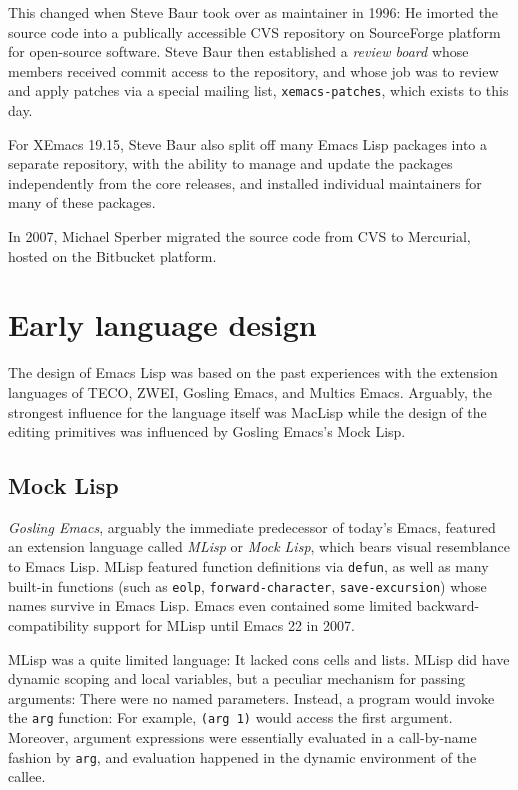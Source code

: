 \documentclass[format=acmsmall, review]{acmart}
\newcommand \Elisp {Emacs Lisp}
\begin{document}
This changed when Steve Baur took over as maintainer in 1996: He
imorted the source code into a publically accessible CVS repository on
SourceForge platform for open-source software.  Steve Baur then
established a \textit{review board} whose members received commit
access to the repository, and whose job was to review and apply
patches via a special mailing list, \texttt{xemacs-patches}, which
exists to this day.

For XEmacs 19.15, Steve Baur also split off many \Elisp{} packages
into a separate repository, with the ability to manage and update the
packages independently from the core releases, and installed
individual maintainers for many of these packages.

In 2007, Michael Sperber migrated the source code from CVS to
Mercurial, hosted on the Bitbucket platform.

\section{Early language design}         %
\label{sec:early-history}

The design of \Elisp{} was based on the past experiences with the extension
languages of TECO, ZWEI, Gosling Emacs, and Multics Emacs.
Arguably, the strongest influence for the language itself was MacLisp while
the design of the editing primitives was influenced by Gosling Emacs's
Mock Lisp.

\subsection{Mock Lisp}
\label{sec:mock-lisp}

\emph{Gosling Emacs}, arguably the immediate predecessor of today's Emacs,
featured an extension language called \emph{MLisp} or \emph{Mock Lisp},
which bears visual resemblance to \Elisp{}.  MLisp featured function
definitions via \texttt{defun}, as well as many built-in functions (such as
\texttt{eolp}, \texttt{forward-character}, \texttt{save-excursion}) whose
names survive in \Elisp{}.  Emacs even contained some limited
back\-ward-compatibility support for MLisp until Emacs 22 in 2007.

MLisp was a quite limited language: It lacked cons cells and lists.
MLisp did have dynamic scoping and local variables, but a peculiar
mechanism for passing arguments:  There were no named
parameters.  Instead, a program would invoke the \texttt{arg}
function: For example, \texttt{(arg 1)} would access the first
argument.  Moreover, argument expressions were essentially evaluated
in a call-by-name fashion by \texttt{arg}, and evaluation happened in
the dynamic environment of the callee.
\end{document}
